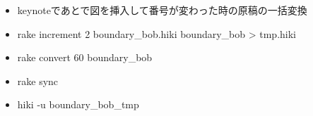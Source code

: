 \begin{itemize}
\item keynoteであとで図を挿入して番号が変わった時の原稿の一括変換
\item rake increment 2 boundary\_bob.hiki boundary\_bob > tmp.hiki
\item rake convert 60 boundary\_bob
\item rake sync
\item hiki -u boundary\_bob\_tmp
\end{itemize}
